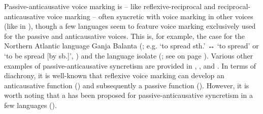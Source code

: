 Passive-anticausative voice marking is -- like reflexive-reciprocal and re\-ci\-pro\-cal-anticausative voice marking -- often syncretic with voice marking in other voices (like in ), though a few languages seem to feature voice marking exclusively used for the passive and anticausative voices. This is, for example, the case for the Northern Atlantic language Ganja Balanta (; e.g.  ‘to spread sth.’ ↔  ‘to spread’ or ‘to be spread [by sb.]’, \citealt[211]{creissels:biaye:2016}) and the language isolate  (; see  on page \pageref{tab:ch7:antc2pass-korean}). Various other examples of passive-anticausative syncretism are provided in , , and . In terms of diachrony, it is well-known that reflexive voice marking can develop an anticausative function () and subsequently a passive function (). However, it is worth noting that a  has been proposed for passive-anticausative syncretism in a few languages ().

